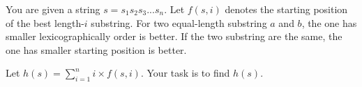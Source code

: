 You are given a string $s = s_1 s_2 s_3 ... s_n$.
Let $f(s,i)$ denotes the starting position of the best length-$i$ substring.
For two equal-length substring $a$ and $b$, the one has smaller lexicographically order is better.
If the two substring are the same, the one has smaller starting position is better.

Let $h(s) = \sum_{i=1}^n i \times f(s, i)$.
Your task is to find $h(s)$.
